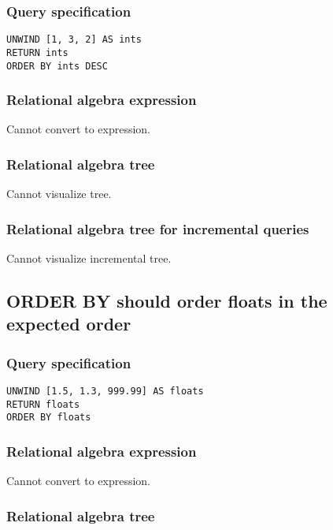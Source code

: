 \subsubsection*{Query specification}

\begin{lstlisting}
UNWIND [1, 3, 2] AS ints
RETURN ints
ORDER BY ints DESC
\end{lstlisting}

\subsubsection*{Relational algebra expression}

Cannot convert to expression.

\subsubsection*{Relational algebra tree}

Cannot visualize tree.

\subsubsection*{Relational algebra tree for incremental queries}

Cannot visualize incremental tree.

\subsection{ORDER BY should order floats in the expected order}

\subsubsection*{Query specification}

\begin{lstlisting}
UNWIND [1.5, 1.3, 999.99] AS floats
RETURN floats
ORDER BY floats
\end{lstlisting}

\subsubsection*{Relational algebra expression}

Cannot convert to expression.

\subsubsection*{Relational algebra tree}


